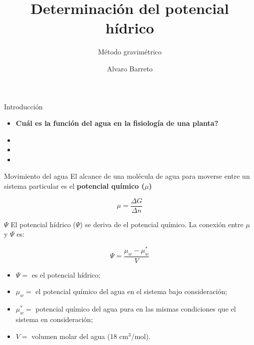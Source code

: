 \documentclass[12pt, aspectratio=169]{beamer}
\author{Alvaro Barreto}
\begin{document}
	\title{Determinaci\'on del potencial h\'idrico}
	\subtitle{M\'etodo gravim\'etrico}
	
	\begin{frame}[plain]
		\titlepage
	\end{frame}

	\begin{frame}{Introducci\'on}
	
		\begin{itemize}
			\item \textbf{\textquestiondown Cu\'al es la funci\'on del agua en la fisiolog\'ia de una planta?}
			\item {}
			\item {}
			\item {}
		\end{itemize}
			
	\end{frame}

	\begin{frame}{Movimiento del agua}
		El alcance de una molécula de agua para moverse entre un sistema particular es el \textbf{potencial qu\'imico ($\mu$)}
		
		$$\mu = \frac{\Delta G}{\Delta n}$$
		
	\end{frame}

	\begin{frame}{$\Psi$}
		El potencial h\'idrico ($\Psi$) se deriva de el potencial qu\'imico.
		La conexi\'on entre $\mu$ y $\Psi$ es:
		
		$$\Psi = \frac{\mu_w - \mu_w^{*}}{V} $$ 
		
		\begin{itemize}
			\item $\Psi = $ es el potencial h\'idrico;
			\item  $\mu_w = $ el potencial qu\'imico del agua en el sistema bajo consideraci\'on;
			\item $\mu_w^{*} = $ potencial qu\'imico del agua pura en las mismas condiciones que el sistema en consideraci\'on;
			\item $V = $ volumen molar del agua (18 cm$^3$/mol).
		\end{itemize}
		
	\end{frame}
\end{document}
